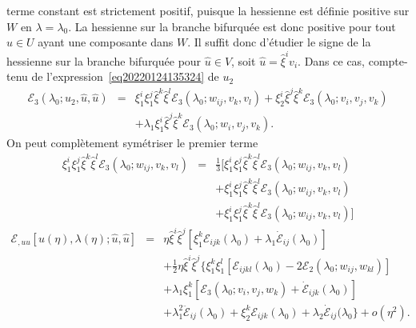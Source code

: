 \documentclass{article}
\newcommand{\nobracket}{}
\newcommand{\nocomma}{}
\newcommand{\nonconverted}[1]{\mbox{}}
\begin{document}
terme constant est strictement positif, puisque la hessienne est d{\'e}finie
positive sur $W$ en $\lambda = \lambda_0$. La hessienne sur la branche
bifurqu{\'e}e est donc positive pour tout $\hat{u} \in U$ ayant une composante
dans $W$. Il suffit donc d'{\'e}tudier le signe de la hessienne sur la branche
bifurqu{\'e}e pour $\hat{u} \in V$, soit $\hat{u} = \hat{\xi}^i v_i$. Dans ce
cas, compte-tenu de l'expression~\eqref{eq20220124135324} de $u_2$
\begin{eqnarray}
  \mathcal{E}_3 (\lambda_0 ; u_2, \hat{u}, \hat{u}) & = & \xi_1^i \xi_1^j 
  \hat{\xi}^k  \hat{\xi}^l \mathcal{E}_3 (\lambda_0 ; w_{i \nocomma j}, v_k,
  v_l) + \xi_2^i  \hat{\xi}^j  \hat{\xi}^k \mathcal{E}_3 (\lambda_0 ; v_i,
  v_j, v_k) \nonumber\\
  &  & + \lambda_1 \xi_1^i  \hat{\xi}^j  \hat{\xi}^k \mathcal{E}_3 (\lambda_0
  ; w_i, v_j, v_k) . 
\end{eqnarray}
On peut compl{\`e}tement sym{\'e}triser le premier terme
\begin{eqnarray}
  \xi_1^i \xi_1^j  \hat{\xi}^k  \hat{\xi}^l \mathcal{E}_3 (\lambda_0 ; w_{i
  \nocomma j}, v_k, v_l) & = & \tfrac{1}{3} [\xi_1^i \xi_1^j  \hat{\xi}^k 
  \hat{\xi}^l \mathcal{E}_3 (\lambda_0 ; w_{i \nocomma j}, v_k, v_l)
  \nobracket \nonumber\\
  &  & + \xi_1^i \xi_1^j  \hat{\xi}^k  \hat{\xi}^l \mathcal{E}_3 (\lambda_0 ;
  w_{i \nocomma j}, v_k, v_l) \nonumber\\
  &  & \nobracket + \xi_1^i \xi_1^j  \hat{\xi}^k  \hat{\xi}^l \mathcal{E}_3
  (\lambda_0 ; w_{i \nocomma j}, v_k, v_l)] 
\end{eqnarray}
\begin{eqnarray}
  \mathcal{E}_{, u \nocomma u} [u (\eta), \lambda (\eta) ; \hat{u}, \hat{u}] &
  = & \eta \hat{\xi}^i  \hat{\xi}^j  [\xi_1^k \mathcal{E}_{i \nocomma j
  \nocomma k} (\lambda_0) + \lambda_1  \dot{\mathcal{E}}_{i \nocomma j}
  (\lambda_0)] \nonumber\\
  &  & + \tfrac{1}{2} \eta \nonconverted{twosuperior} \hat{\xi}^i 
  \hat{\xi}^j  \{ \xi_1^k \xi_1^l  [\mathcal{E}_{i \nocomma j \nocomma k
  \nocomma l} (\lambda_0) - 2\mathcal{E}_2 (\lambda_0 ; w_{i \nocomma j}, w_{k
  \nocomma l})] \nobracket \nonumber\\
  &  & + \lambda_1 \xi_1^k  [\mathcal{E}_3 (\lambda_0 ; v_i, v_j, w_k) +
  \dot{\mathcal{E}}_{i \nocomma j \nocomma k} (\lambda_0)] \nonumber\\
  &  & + \lambda_1^2  \ddot{\mathcal{E}}_{i \nocomma j} (\lambda_0) + \xi_2^k
  \mathcal{E}_{i \nocomma j \nocomma k} (\lambda_0) + \lambda_2 
  \dot{\mathcal{E}}_{i \nocomma j} (\lambda_0 \} + o (\eta^2) . 
  \label{eq20220203144500}
\end{eqnarray}
\end{document}
